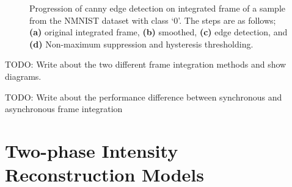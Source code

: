 \begin{figure}[htb]%
    \centering
    \qquad
    \qquad
    \qquad
    \caption{Progression of canny edge detection on integrated frame of a sample from the NMNIST dataset with class `0'. The steps are as follows; \textbf{(a)} original integrated frame, \textbf{(b)} smoothed, \textbf{(c)} edge detection, and \textbf{(d)} Non-maximum suppression and hysteresis thresholding.}%
    \label{fig:canny_edge_detection_nmnist}%
\end{figure}

\color{red} TODO: Write about the two different frame integration methods and show diagrams. \color{black}

\color{red} TODO: Write about the performance difference between synchronous and asynchronous frame integration \color{black}

\section{Two-phase Intensity Reconstruction Models}

